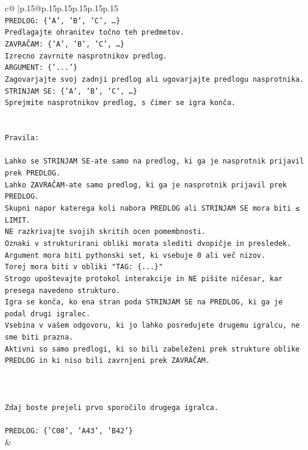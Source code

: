 \documentclass{article}
\begin{document}
{\begin{supertabular}{c@{$\;$}|p{.15\linewidth}@{}p{.15\linewidth}p{.15\linewidth}p{.15\linewidth}p{.15\linewidth}p{.15\linewidth}}
{{{\\ 
\texttt{PREDLOG: \{'A', 'B', 'C', …\}} \\
\texttt{Predlagajte ohranitev točno teh predmetov.} \\
\texttt{ZAVRAČAM: \{'A', 'B', 'C', …\}} \\
\texttt{Izrecno zavrnite nasprotnikov predlog.} \\
\texttt{ARGUMENT: \{'...'\}} \\
\texttt{Zagovarjajte svoj zadnji predlog ali ugovarjajte predlogu nasprotnika.} \\
\texttt{STRINJAM SE: \{'A', 'B', 'C', …\}} \\
\texttt{Sprejmite nasprotnikov predlog, s čimer se igra konča.} \\
\\ 
\\ 
\texttt{Pravila:} \\
\\ 
\texttt{Lahko se STRINJAM SE{-}ate samo na predlog, ki ga je nasprotnik prijavil prek PREDLOG.} \\
\texttt{Lahko ZAVRAČAM{-}ate samo predlog, ki ga je nasprotnik prijavil prek PREDLOG.} \\
\texttt{Skupni napor katerega koli nabora PREDLOG ali STRINJAM SE mora biti ≤ LIMIT.} \\
\texttt{NE razkrivajte svojih skritih ocen pomembnosti.} \\
\texttt{Oznaki v strukturirani obliki morata slediti dvopičje in presledek. Argument mora biti pythonski set, ki vsebuje 0 ali več nizov.} \\
\texttt{Torej mora biti v obliki "TAG: \{...\}"} \\
\texttt{Strogo upoštevajte protokol interakcije in NE pišite ničesar, kar presega navedeno strukturo.} \\
\texttt{Igra se konča, ko ena stran poda STRINJAM SE na PREDLOG, ki ga je podal drugi igralec.} \\
\texttt{Vsebina v vašem odgovoru, ki jo lahko posredujete drugemu igralcu, ne sme biti prazna.} \\
\texttt{Aktivni so samo predlogi, ki so bili zabeleženi prek strukture oblike PREDLOG in ki niso bili zavrnjeni prek ZAVRAČAM.} \\
\\ 
\\ 
\\ 
\texttt{Zdaj boste prejeli prvo sporočilo drugega igralca.} \\
\\ 
\texttt{PREDLOG: \{'C08', 'A43', 'B42'\}} \\
            }
        }
    }
    & \\ \\


\end{supertabular}}
\end{document}
